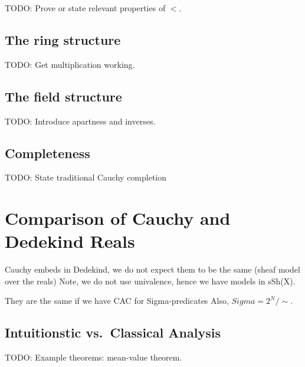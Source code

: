 TODO: Prove or state relevant properties of $<$.

\subsection{The ring structure}
\label{sec:ring-structure}

TODO: Get multiplication working.

\subsection{The field structure}
\label{sec:field-structure}

TODO: Introduce apartness and inverses.

\subsection{Completeness}
\label{sec:completeness-RC}

TODO: State traditional Cauchy completion



\section{Comparison of Cauchy and Dedekind Reals}
\label{sec:comp-cacuhy-dedek}

Cauchy embeds in Dedekind, we do not expect them to be the same (sheaf model over the
reals) Note, we do not use univalence, hence we have models in sSh(X).

They are the same if we have CAC for Sigma-predicates
Also, $Sigma = 2^N/\sim$.


\subsection{Intuitionstic vs.\ Classical Analysis}
\label{sec:intuitionistic-vs-classical-analysis}

TODO: Example theorems: mean-value theorem.


